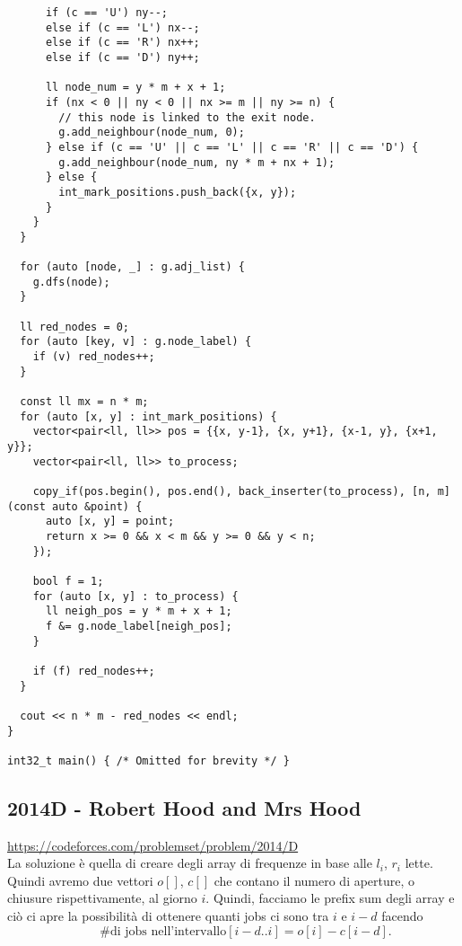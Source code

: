 \begin{verbatim}
      if (c == 'U') ny--;
      else if (c == 'L') nx--;
      else if (c == 'R') nx++;
      else if (c == 'D') ny++;

      ll node_num = y * m + x + 1;
      if (nx < 0 || ny < 0 || nx >= m || ny >= n) {
        // this node is linked to the exit node.
        g.add_neighbour(node_num, 0);
      } else if (c == 'U' || c == 'L' || c == 'R' || c == 'D') {
        g.add_neighbour(node_num, ny * m + nx + 1);
      } else {
        int_mark_positions.push_back({x, y});
      }
    }
  }

  for (auto [node, _] : g.adj_list) {
    g.dfs(node);
  }

  ll red_nodes = 0;
  for (auto [key, v] : g.node_label) {
    if (v) red_nodes++;
  }

  const ll mx = n * m;
  for (auto [x, y] : int_mark_positions) {
    vector<pair<ll, ll>> pos = {{x, y-1}, {x, y+1}, {x-1, y}, {x+1, y}};
    vector<pair<ll, ll>> to_process;

    copy_if(pos.begin(), pos.end(), back_inserter(to_process), [n, m](const auto &point) {
      auto [x, y] = point;
      return x >= 0 && x < m && y >= 0 && y < n;
    });

    bool f = 1;
    for (auto [x, y] : to_process) {
      ll neigh_pos = y * m + x + 1;
      f &= g.node_label[neigh_pos];
    }

    if (f) red_nodes++;
  }

  cout << n * m - red_nodes << endl;
}

int32_t main() { /* Omitted for brevity */ }
\end{verbatim}


\subsection{2014D - Robert Hood and Mrs Hood}
\url{https://codeforces.com/problemset/problem/2014/D} \\ 
La soluzione è quella di creare degli array di frequenze in base alle $l_i$, $r_i$ lette. Quindi avremo due vettori $o[]$, $c[]$ che contano il numero di aperture, o chiusure rispettivamente, al giorno $i$. Quindi, facciamo le prefix sum degli array e ciò ci apre la possibilità di ottenere quanti jobs ci sono tra $i$ e $i-d$ facendo 
\begin{equation}
    \quad \quad \text{\# di jobs nell'intervallo} [i - d..i] = o[i] - c[i-d].
\end{equation}

